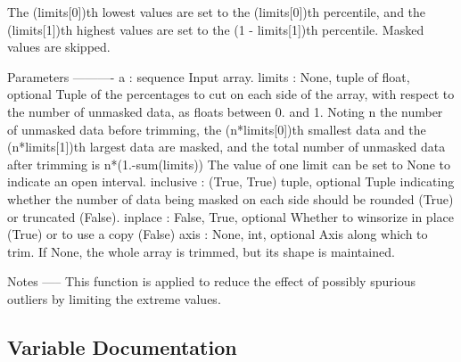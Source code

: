 \begin{DoxyVerb}
\begin{DoxyVerb}
\begin{DoxyVerb}
The (limits[0])th lowest values are set to the (limits[0])th percentile,
and the (limits[1])th highest values are set to the (1 - limits[1])th
percentile.
Masked values are skipped.


Parameters
----------
a : sequence
    Input array.
limits : {None, tuple of float}, optional
    Tuple of the percentages to cut on each side of the array, with respect
    to the number of unmasked data, as floats between 0. and 1.
    Noting n the number of unmasked data before trimming, the
    (n*limits[0])th smallest data and the (n*limits[1])th largest data are
    masked, and the total number of unmasked data after trimming
    is n*(1.-sum(limits)) The value of one limit can be set to None to
    indicate an open interval.
inclusive : {(True, True) tuple}, optional
    Tuple indicating whether the number of data being masked on each side
    should be rounded (True) or truncated (False).
inplace : {False, True}, optional
    Whether to winsorize in place (True) or to use a copy (False)
axis : {None, int}, optional
    Axis along which to trim. If None, the whole array is trimmed, but its
    shape is maintained.

Notes
-----
This function is applied to reduce the effect of possibly spurious outliers
by limiting the extreme values.\end{DoxyVerb}
 

\subsection{Variable Documentation}
\hypertarget{namespacescipy_1_1stats_1_1mstats__basic_ae5a519977e74f95928e24b370e209114}{}

\end{DoxyVerb}
\end{DoxyVerb}

